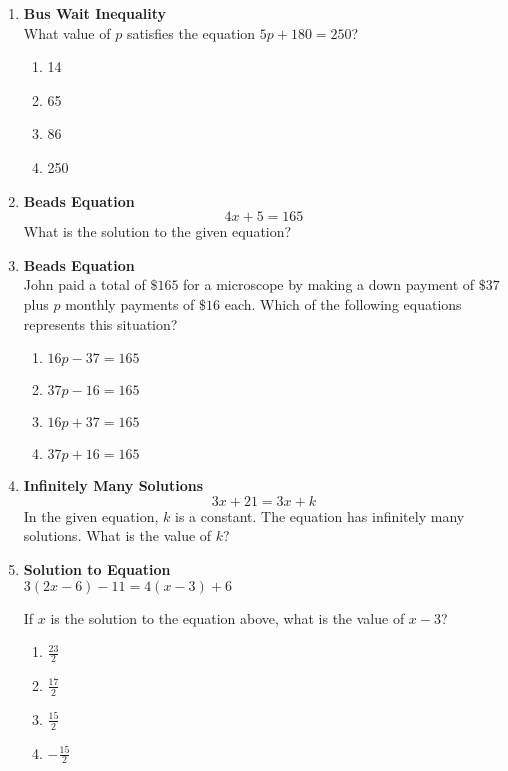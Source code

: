 \begin{enumerate}
\item \textbf{Bus Wait Inequality}\\
What value of $p$ satisfies the equation $5p + 180 = 250$?
\begin{enumerate}[label=(\Alph*)]
  \item 14
  \item 65
  \item 86
  \item 250
\end{enumerate}
\begin{subanswer}
\end{subanswer}

\item \textbf{Beads Equation}\\
$$
4x + 5 = 165
$$
What is the solution to the given equation?
\begin{subanswer}
\end{subanswer}

\item \textbf{Beads Equation}\\
John paid a total of $\$ 165$ for a microscope by making a down payment of $\$ 37$ plus $p$ monthly payments of $\$ 16$ each. Which of the following equations represents this situation?
\begin{enumerate}[label=(\Alph*)]
  \item $16p - 37 = 165$
  \item $37p - 16 = 165$
  \item $16p + 37 = 165$
  \item $37p + 16 = 165$
\end{enumerate}
\begin{subanswer}
\end{subanswer}

\item \textbf{Infinitely Many Solutions}\\
$$
3x + 21 = 3x + k
$$
In the given equation, $k$ is a constant. The equation has infinitely many solutions. What is the value of $k$?
\begin{subanswer}
\end{subanswer}

\item \textbf{Solution to Equation}\\
$3(2x - 6) - 11 = 4(x - 3) + 6$

If $x$ is the solution to the equation above, what is the value of $x - 3$?
\begin{enumerate}[label=(\Alph*)]
  \item $\frac{23}{2}$
  \item $\frac{17}{2}$
  \item $\frac{15}{2}$
  \item $-\frac{15}{2}$
\end{enumerate}
\begin{subanswer}
\end{subanswer}


\end{enumerate}

